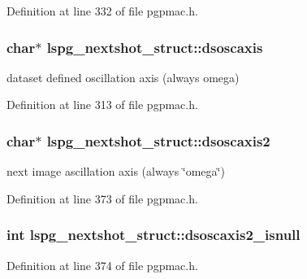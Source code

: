 Definition at line 332 of file pgpmac.\-h.

\hypertarget{structlspg__nextshot__struct_a9a62c304e66013e8e5e5618a44f0b6d4}{
\subsubsection[{dsoscaxis}]{\setlength{\rightskip}{0pt plus 5cm}char$\ast$ lspg\-\_\-nextshot\-\_\-struct\-::dsoscaxis}}\label{structlspg__nextshot__struct_a9a62c304e66013e8e5e5618a44f0b6d4}


dataset defined oscillation axis (always omega) 



Definition at line 313 of file pgpmac.\-h.

\hypertarget{structlspg__nextshot__struct_ac86005a6e90ff502da9e95b59d0b7a5f}{
\subsubsection[{dsoscaxis2}]{\setlength{\rightskip}{0pt plus 5cm}char$\ast$ lspg\-\_\-nextshot\-\_\-struct\-::dsoscaxis2}}\label{structlspg__nextshot__struct_ac86005a6e90ff502da9e95b59d0b7a5f}


next image ascillation axis (always \char`\"{}omega\char`\"{}) 



Definition at line 373 of file pgpmac.\-h.

\hypertarget{structlspg__nextshot__struct_a98e280e99ae847559bb82836df3c32d1}{
\subsubsection[{dsoscaxis2\-\_\-isnull}]{\setlength{\rightskip}{0pt plus 5cm}int lspg\-\_\-nextshot\-\_\-struct\-::dsoscaxis2\-\_\-isnull}}\label{structlspg__nextshot__struct_a98e280e99ae847559bb82836df3c32d1}


Definition at line 374 of file pgpmac.\-h.

